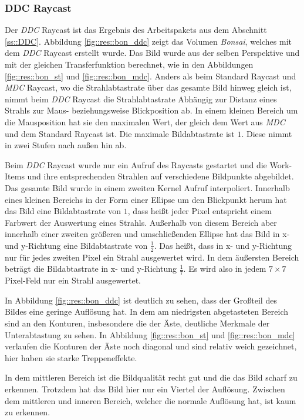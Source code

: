 \subsubsection{DDC Raycast}\label{ss::res::ddc}
Der \emph{DDC} Raycast ist das Ergebnis des Arbeitspakets aus dem Abschnitt \ref{ss::DDC}.
Abbildung \ref{fig::res::bon_ddc} zeigt das Volumen \emph{Bonsai}, welches mit dem \emph{DDC} Raycast erstellt wurde.
Das Bild wurde aus der selben Perspektive und mit der gleichen Transferfunktion berechnet, wie in den Abbildungen \ref{fig::res::bon_st} und \ref{fig::res::bon_mdc}.
Anders als beim Standard Raycast und \emph{MDC} Raycast, wo die Strahlabtastrate über das gesamte Bild hinweg gleich ist, nimmt beim \emph{DDC} Raycast die Strahlabtastrate Abhängig zur Distanz eines Strahls zur Maus- beziehungsweise Blickposition ab.
In einem kleinen Bereich um die Mausposition hat sie den maximalen Wert, der gleich dem Wert aus \emph{MDC} und dem Standard Raycast ist.
Die maximale Bildabtastrate ist $1$.
Diese nimmt in zwei Stufen nach außen hin ab.

Beim \emph{DDC} Raycast wurde nur ein Aufruf des Raycasts gestartet und die Work-Items und ihre entsprechenden Strahlen auf verschiedene Bildpunkte abgebildet.
Das gesamte Bild wurde in einem zweiten Kernel Aufruf interpoliert.
Innerhalb eines kleinen Bereichs in der Form einer Ellipse um den Blickpunkt herum hat das Bild eine Bildabtastrate von $1$, dass heißt jeder Pixel entspricht einem Farbwert der Auswertung eines Strahls.
Außerhalb von diesem Bereich aber innerhalb einer zweiten größeren und umschließenden Ellipse hat das Bild in x- und y-Richtung eine Bildabtastrate von $\frac{1}{2}$.
Das heißt, dass in x- und y-Richtung nur für jedes zweiten Pixel ein Strahl ausgewertet wird.
In dem äußersten Bereich beträgt die Bildabtastrate in x- und y-Richtung $\frac{1}{7}$.
Es wird also in jedem $7\times7$\,Pixel-Feld nur ein Strahl ausgewertet.


In Abbildung \ref{fig::res::bon_ddc} ist deutlich zu sehen, dass der Großteil des Bildes eine geringe Auflösung hat.
In dem am niedrigsten abgetasteten Bereich sind an den Konturen, insbesondere die der Äste, deutliche Merkmale der Unterabtastung zu sehen.
In Abbildung \ref{fig::res::bon_st} und \ref{fig::res::bon_mdc} verlaufen die Konturen der Äste noch diagonal und sind relativ weich gezeichnet, hier haben sie starke Treppeneffekte.

In dem mittleren Bereich ist die Bildqualität recht gut und die das Bild scharf zu erkennen.
Trotzdem hat das Bild hier nur ein Viertel der Auflösung.
Zwischen dem mittleren und inneren Bereich, welcher die normale Auflösung hat, ist kaum zu erkennen.

